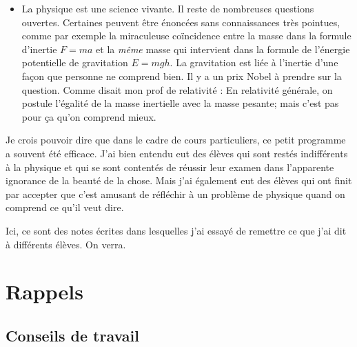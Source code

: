 \begin{itemize}
\item La physique est une science vivante. Il reste de nombreuses questions ouvertes. Certaines peuvent être énoncées sans connaissances très pointues, comme par exemple la miraculeuse coïncidence entre la masse dans la formule d'inertie $F=ma$ et la \emph{même} masse qui intervient dans la formule de l'énergie potentielle de gravitation $E=mgh$. La gravitation est liée à l'inertie d'une façon que personne ne comprend bien. Il y a un prix Nobel à prendre sur la question. Comme disait mon prof de relativité : \og En relativité générale, on postule l'égalité de la masse inertielle avec la masse pesante; mais c'est pas pour ça qu'on comprend mieux\fg.
\end{itemize}
Je crois pouvoir dire que dans le cadre de cours particuliers, ce petit programme a souvent été efficace. J'ai bien entendu eut des élèves qui sont restés indifférents à la physique et qui se sont contentés de réussir leur examen dans l'apparente ignorance de la beauté de la chose. Mais j'ai également eut des élèves qui ont finit par accepter que c'est amusant de réfléchir à un problème de physique quand on comprend ce qu'il veut dire.

Ici, ce sont des notes écrites dans lesquelles j'ai essayé de remettre ce que j'ai dit à différents élèves. On verra.

\section{Rappels}

\subsection*{Conseils de travail}


